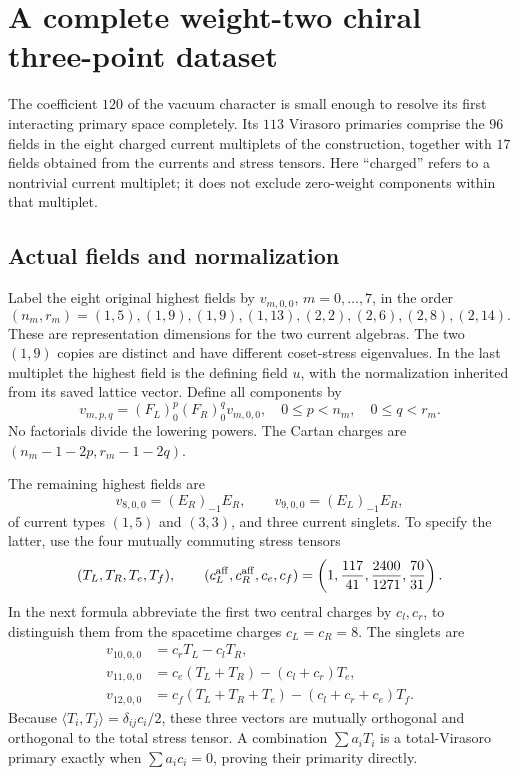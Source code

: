 \section{A complete weight-two chiral three-point dataset}
\label{sec:physics-couplings}

The coefficient $120$ of the vacuum character is small enough to
resolve its first interacting primary space completely. Its $113$
Virasoro primaries comprise the $96$ fields in the eight charged
current multiplets of the construction, together with $17$ fields
obtained from the currents and stress tensors. Here ``charged'' refers
to a nontrivial current multiplet; it does not exclude zero-weight
components within that multiplet.

\subsection{Actual fields and normalization}

Label the eight original highest fields by $v_{m,0,0}$,
$m=0,\ldots,7$, in the order
\[
 (n_m,r_m)=(1,5),(1,9),(1,9),(1,13),
            (2,2),(2,6),(2,8),(2,14).
\]
These are representation dimensions for the two current algebras.
The two $(1,9)$ copies are distinct and have different coset-stress
eigenvalues. In the last multiplet the highest field is the defining
field $u$, with the normalization inherited from its saved lattice
vector. Define all components by
\begin{equation}\label{eq:physics-primary-basis}
 v_{m,p,q}=(F_L)_0^p(F_R)_0^qv_{m,0,0},
 \quad 0\leq p<n_m,\quad0\leq q<r_m.
\end{equation}
No factorials divide the lowering powers. The Cartan charges are
$(n_m-1-2p,r_m-1-2q)$.

The remaining highest fields are
\[
 v_{8,0,0}=(E_R)_{-1}E_R,\qquad
 v_{9,0,0}=(E_L)_{-1}E_R,
\]
of current types $(1,5)$ and $(3,3)$, and three current singlets.
To specify the latter, use the four mutually commuting stress tensors
\[
 (T_L,T_R,T_e,T_f),\qquad
 (c_L^{\rm aff},c_R^{\rm aff},c_e,c_f)
 =\left(1,\frac{117}{41},\frac{2400}{1271},\frac{70}{31}\right).
\]
In the next formula abbreviate the first two central charges by
$c_l,c_r$, to distinguish them from the spacetime charges $c_L=c_R=8$.
The singlets are
\begin{align}
 v_{10,0,0}&=c_rT_L-c_lT_R,\\
 v_{11,0,0}&=c_e(T_L+T_R)-(c_l+c_r)T_e,\\
 v_{12,0,0}&=c_f(T_L+T_R+T_e)-(c_l+c_r+c_e)T_f.
 \label{eq:physics-stress-primaries}
\end{align}
Because $\langle T_i,T_j\rangle=\delta_{ij}c_i/2$, these three
vectors are mutually orthogonal and orthogonal to the total stress
tensor. A combination $\sum a_iT_i$ is a total-Virasoro primary
exactly when $\sum a_ic_i=0$, proving their primarity directly.


